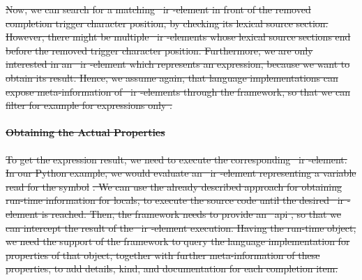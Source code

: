 \documentclass[sigplan,10pt,review,anonymous]{acmart}
\providecommand{\DIFdel}[1]{{\protect\color{red}\sout{#1}}}                      %
\providecommand{\DIFdelbegin}{} %
\providecommand{\DIFdelend}{} %
\begin{document}
\DIFdelbegin \DIFdel{Now, we can search for a matching \mbox{%
\ac{ir}}\hspace{0pt}%
-element in front of the removed completion trigger character position, by checking its lexical source section. However, there might be multiple \mbox{%
\ac{ir}}\hspace{0pt}%
-elements whose lexical source sections end before the removed trigger character position. Furthermore, we are only interested in an \mbox{%
\ac{ir}}\hspace{0pt}%
-element which represents an expression, because we want to obtain its result. Hence, we assume again, that language implementations can expose meta-information of \mbox{%
\ac{ir}}\hspace{0pt}%
-elements through the
framework, so that we can filter for example for expressions only .
}\DIFdelend %

\DIFdelbegin \paragraph{\DIFdel{Obtaining the Actual Properties}}
\addtocounter{paragraph}{-1}%
\DIFdel{To get the expression result, we need to execute the corresponding \mbox{%
\ac{ir}}\hspace{0pt}%
-element. In our Python example, we would evaluate an \mbox{%
\ac{ir}}\hspace{0pt}%
-element representing a variable read for the symbol }%
\DIFdel{. We can use the already described approach for obtaining run-time information for locals, to execute the source code until the desired \mbox{%
\ac{ir}}\hspace{0pt}%
-element is reached. Then, the framework needs to
provide an \mbox{%
\ac{api}}\hspace{0pt}%
, so that we can intercept the result of the \mbox{%
\ac{ir}}\hspace{0pt}%
-element execution. Having the run-time object, we need the support of the framework to query the language implementation for properties of that object, together with further meta-information of these properties, to add details, kind, and documentation for each completion item.
}\DIFdelend %
\end{document}
